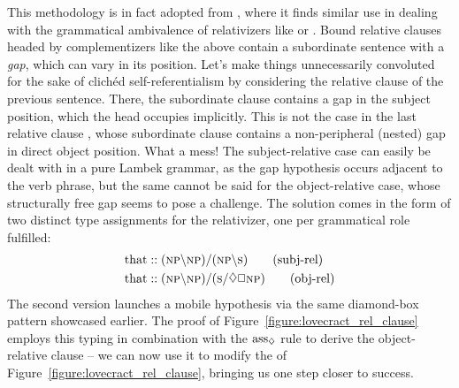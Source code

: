 This methodology is in fact adopted from \citet{moortgat1999constants}, where it finds similar use in dealing with the grammatical ambivalence of relativizers like  or .
Bound relative clauses headed by complementizers like the above contain a subordinate sentence with a \textit{gap}, which can vary in its position.
Let's make things unnecessarily convoluted for the sake of clich{\'e}d self-referentialism by considering the relative clause  of the previous sentence.
There, the subordinate clause  contains a gap in the subject position, which the head  occupies implicitly.
This is not the case in the last relative clause , whose subordinate clause  contains a non-peripheral (nested) gap in direct object position.
What a mess! 
The subject-relative case can easily be dealt with in a pure Lambek grammar, as the gap hypothesis occurs adjacent to the verb phrase, but
the same cannot be said for the object-relative case, whose structurally free gap seems to pose a challenge.
The solution comes in the form of two distinct type assignments for the relativizer, one per grammatical role fulfilled:
\begin{align*}
	\w{that} &:: (\np\divleft\np)\divright(\np\divleft\s) \tag{subj-rel}\\
	\w{that} &:: (\np\divleft\np)\divright(\s\divright\diamond\Box \np ) \tag{obj-rel}
\end{align*}
The second version launches a mobile \np[s] hypothesis via the same diamond-box pattern showcased earlier.
The proof of Figure~\ref{figure:lovecract_rel_clause} employs this typing in combination with the $\rulestyle{ass}_{\diamond}$ rule to derive the object-relative clause  -- we can now use it to modify the  of Figure~\ref{figure:lovecract_rel_clause}, bringing us one step closer to success.


